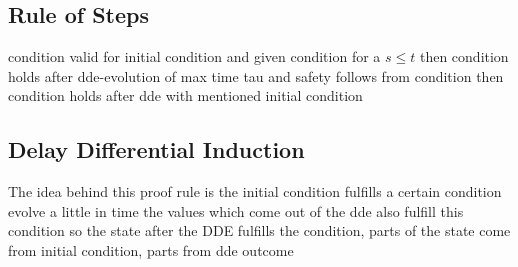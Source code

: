 \documentclass[10pt]{report}
\begin{document}
    \subsection{Rule of Steps}
        \label{sec:rule-of-steps}

        condition valid for initial condition and given condition for a $s\leq t$ then condition holds after dde-evolution of max time tau and safety follows from condition then condition holds after dde with mentioned initial condition

        \begin{calculus}
        \end{calculus}

    \subsection{Delay Differential Induction}
        \label{sec:delay-differential-induction}

        The idea behind this proof rule is
        the initial condition fulfills a certain condition
        evolve a little in time
        the values which come out of the dde also fulfill this condition
        so the state after the DDE fulfills the condition, parts of the state come from initial condition, parts from dde outcome

        \begin{calculus}
        \end{calculus}
\end{document}
